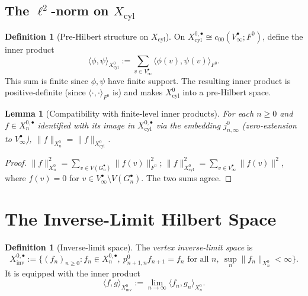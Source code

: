 \documentclass[11pt, a4paper]{amsart}
\newtheorem{lemma}[theorem]{Lemma}
\theoremstyle{definition}
\newtheorem{definition}[theorem]{Definition}
\newcommand{\inv}{\mathrm{inv}}
\newcommand{\cyl}{\mathrm{cyl}}
\begin{document}
\subsection{The $\ell^2$-norm on $X_\cyl$}

\begin{definition}[Pre-Hilbert structure on $X_\cyl$]
\label{def:Xcyl-norm}
On $X_\cyl^{0, \bullet} \cong c_{00}(V_\infty^\bullet; F^0)$, define
the inner product
\[
  \langle \phi, \psi \rangle_{X_\cyl^0} :=
    \sum_{v \in V_\infty^\bullet} \langle \phi(v), \psi(v)
    \rangle_{F^0}.
\]
This sum is finite since $\phi, \psi$ have finite support. The
resulting inner product is positive-definite (since $\langle \cdot,
\cdot \rangle_{F^0}$ is) and makes $X_\cyl^0$ into a pre-Hilbert
space.
\end{definition}

\begin{lemma}[Compatibility with finite-level inner products]
\label{lem:Xcyl-compatibility}
For each $n \geq 0$ and $f \in X_n^{0, \bullet}$ identified with
its image in $X_\cyl^{0, \bullet}$ via the embedding $j_{n,
\infty}^0$ (zero-extension to $V_\infty^\bullet$),
$\|f\|_{X_n^0} = \|f\|_{X_\cyl^0}$.
\end{lemma}

\begin{proof}
$\|f\|_{X_n^0}^2 = \sum_{v \in V(G_n^\bullet)} \|f(v)\|^2_{F^0}$;
$\|f\|_{X_\cyl^0}^2 = \sum_{v \in V_\infty^\bullet} \|f(v)\|^2$,
where $f(v) = 0$ for $v \in V_\infty^\bullet \setminus V(G_n^
\bullet)$. The two sums agree.
\end{proof}

\section{The Inverse-Limit Hilbert Space}
\label{sec:inv-lim}

\begin{definition}[Inverse-limit space]
\label{def:Xinv}
The \emph{vertex inverse-limit space} is
\[
  X_\inv^{0, \bullet} :=
    \big\{(f_n)_{n \geq 0} : f_n \in X_n^{0, \bullet},\
    p_{n+1, n}^0 f_{n+1} = f_n \text{ for all } n,\
    \sup_n \|f_n\|_{X_n^0} < \infty \big\}.
\]
It is equipped with the inner product
\[
  \langle f, g \rangle_{X_\inv^0} := \lim_{n \to \infty}
    \langle f_n, g_n \rangle_{X_n^0}.
\]
\end{definition}
\end{document}
